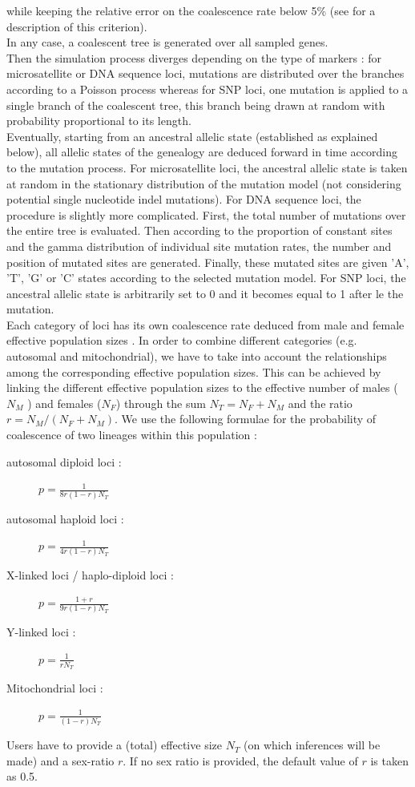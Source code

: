 \begin{description}
while keeping the relative error on the coalescence rate below 5\%
(see \citet{C2008} for a description of this criterion).\\
 In any case, a coalescent tree is generated over all sampled genes.\\
 Then the simulation process diverges depending on the type of markers
: for microsatellite or DNA sequence loci, mutations are distributed
over the branches according to a Poisson process whereas for SNP loci,
one mutation is applied to a single branch of the coalescent tree,
this branch being drawn at random with probability proportional to
its length.\\
 Eventually, starting from an ancestral allelic state (established
as explained below), all allelic states of the genealogy are deduced
forward in time according to the mutation process. For microsatellite
loci, the ancestral allelic state is taken at random in the stationary
distribution of the mutation model (not considering potential single
nucleotide indel mutations). For DNA sequence loci, the procedure
is slightly more complicated. First, the total number of mutations
over the entire tree is evaluated. Then according to the proportion
of constant sites and the gamma distribution of individual site mutation
rates, the number and position of mutated sites are generated. Finally,
these mutated sites are given 'A', 'T', 'G' or 'C' states according
to the selected mutation model. For SNP loci, the ancestral allelic
state is arbitrarily set to 0 and it becomes equal to 1 after le the
mutation.\\
 Each category of loci has its own coalescence rate deduced from male
and female effective population sizes . In order to combine different
categories (e.g. autosomal and mitochondrial), we have to take into
account the relationships among the corresponding effective population
sizes. This can be achieved by linking the different effective population
sizes to the effective number of males ( $N_{M}$ ) and females ($N_{F}$)
through the sum $N_{T}=N_{F}+N_{M}$ and the ratio $r=N_{M}/(N_{F}+N_{M})$.
We use the following formulae for the probability of coalescence of
two lineages within this population :

\begin{description}
\item [{autosomal diploid loci :}] $p=\frac{1}{8r(1-r)N_{T}}$
\item [{autosomal haploid loci :}] $p=\frac{1}{4r(1-r)N_{T}}$
\item [{X-linked loci / haplo-diploid loci :}] $p=\frac{1+r}{9r(1-r)N_{T}}$
\item [{Y-linked loci :}] $p=\frac{1}{rN_{T}}$
\item [{Mitochondrial loci :}] $p=\frac{1}{(1-r)N_{T}}$
\end{description}

Users have to provide a (total) effective size $N_{T}$ (on which
inferences will be made) and a sex-ratio $r$. If no sex ratio is
provided, the default value of $r$ is taken as 0.5.

\end{description}

